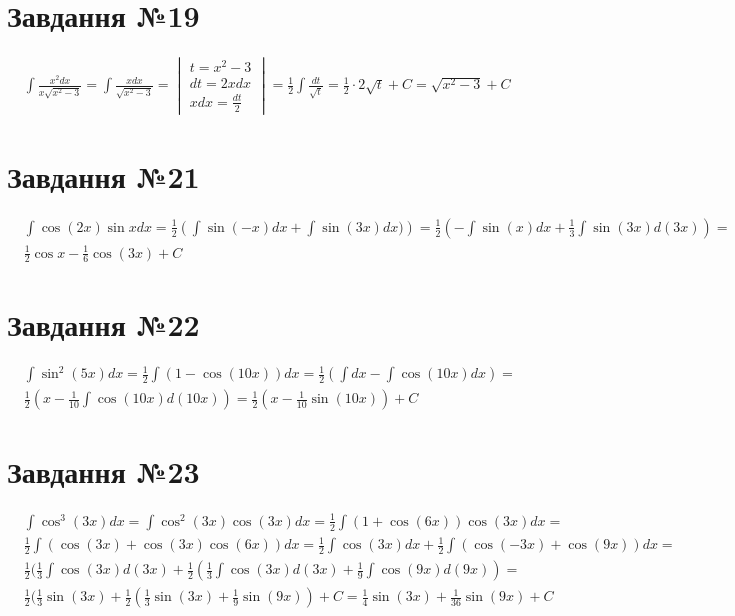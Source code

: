 \documentclass{report}
\begin{document}
\section{Завдання №19}
\begin{equation}\label{eq19}\begin{split}
	& \int \frac{x^2 dx}{x\sqrt{x^2 - 3}} = \int \frac{xdx}{\sqrt{x^2 - 3}} = \begin{vmatrix}t = x^2 - 3\\dt = 2xdx\\xdx = \frac{dt}{2}\end{vmatrix} = \frac{1}{2}\int\frac{dt}{\sqrt{t}} = \frac{1}{2}\cdot2\sqrt{t} + C = \sqrt{x^2 - 3} + C
\end{split}\end{equation}

\section{Завдання №21}
\begin{equation}\label{eq21}\begin{split}
	& \int \cos(2x)\sin x dx=\frac{1}{2} \left(\int \sin(-x)dx + \int\sin(3x)dx)\right) = \frac{1}{2}\left(-\int\sin(x)dx + \frac{1}{3}\int\sin(3x)d(3x)\right) =\\
	& \frac{1}{2}\cos x - \frac{1}{6} \cos(3x) + C
\end{split}\end{equation}

\section{Завдання №22}
\begin{equation}\label{eq22}\begin{split}
	& \int \sin^2(5x)dx = \frac{1}{2}\int(1 - \cos (10x))dx = \frac{1}{2}(\int dx - \int\cos(10x)dx) =\\
	& \frac{1}{2}(x - \frac{1}{10}\int\cos(10x)d(10x)) = \frac{1}{2}(x - \frac{1}{10}\sin(10x)) + C
\end{split}\end{equation}

\section{Завдання №23}
\begin{equation}\label{eq23}\begin{split}
	& \int \cos^3(3x)dx = \int \cos^2(3x)\cos(3x)dx = \frac{1}{2}\int(1+\cos(6x))\cos(3x)dx =\\
	& \frac{1}{2}\int(\cos(3x) + \cos(3x)\cos(6x))dx = \frac{1}{2}\int\cos(3x)dx + \frac{1}{2}\int(\cos(-3x) + \cos(9x))dx =\\
	& \frac{1}{2}(\frac{1}{3}\int\cos(3x)d(3x) + \frac{1}{2}(\frac{1}{3}\int\cos(3x)d(3x) + \frac{1}{9}\int\cos(9x)d(9x)) =\\
	& \frac{1}{2}(\frac{1}{3}\sin(3x) + \frac{1}{2}(\frac{1}{3}\sin(3x) + \frac{1}{9}\sin(9x)) + C = \frac{1}{4}\sin(3x) + \frac{1}{36}\sin(9x) + C
\end{split}\end{equation}
\end{document}
